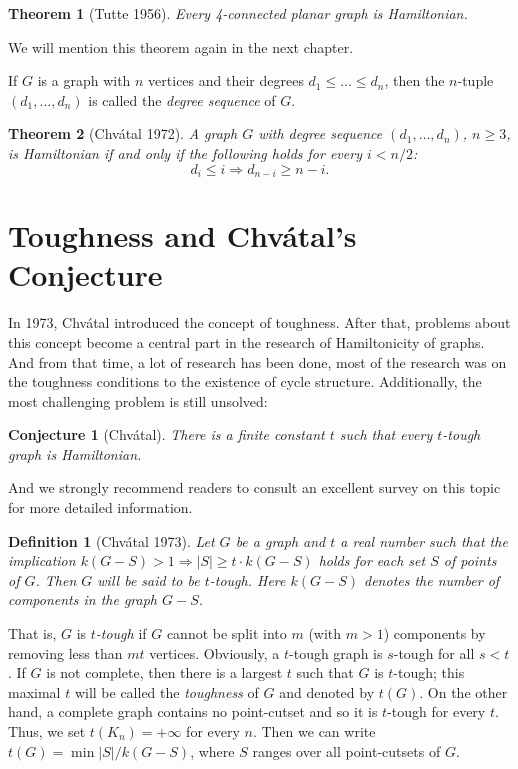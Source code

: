 \documentclass[12pt]{report}
\newtheorem{theorem}{Theorem}
\newtheorem{definition}{Definition}
\newtheorem{conjecture}{Conjecture}
\begin{document}
\begin{theorem}[Tutte 1956]\label{thm4cpgih1}
Every 4-connected planar graph is Hamiltonian.
\end{theorem}
We will mention this theorem again in the next chapter.

If $G$ is a graph with $n$ vertices and their degrees $d_1\le\ldots\le d_n$, then the $n$-tuple $(d_1,\ldots,d_n)$ is called the {\em degree sequence} of $G$.
\begin{theorem}[Chv{\'a}tal 1972]
A graph $G$ with degree sequence $(d_1,\ldots,d_n)$, $n\ge3$, is Hamiltonian if and only if the following holds for every $i<n/2$:
$$d_i\le i\Rightarrow d_{n-i}\ge n-i.$$
\end{theorem}





\section{Toughness and Chv{\'a}tal's Conjecture}
In 1973, Chv{\'a}tal \cite{chvatal1973tough} introduced the concept of toughness. After that, problems about this concept become a central part in the research of Hamiltonicity of graphs. And from that time, a lot of research has been done, most of the research was on the toughness conditions to the existence of cycle structure. Additionally, the most challenging problem is still unsolved: 
\begin{conjecture}[Chv{\'a}tal]\label{cj1chath}
There is a finite constant $t$ such that every $t$-tough graph is Hamiltonian.
\end{conjecture}
And we strongly recommend readers to consult an excellent survey \cite{MR2221006} on this topic for more detailed information.

\begin{definition}[Chv{\'a}tal 1973]\label{c1}
Let $G$ be a graph and $t$ a real number such that the implication $k(G-S)>1\Rightarrow |S|\ge t\cdot k(G-S)$ holds for each set $S$ of points of $G$. Then $G$ will be said to be $t$-tough. Here $k(G-S)$ denotes the number of components in the graph $G-S$.
\end{definition}
That is, $G$ is {\em $t$-tough} if $G$ cannot be split into $m$ (with $m>1$) components by removing less than $mt$ vertices.
Obviously, a $t$-tough graph is $s$-tough for all $s<t$. If $G$ is not complete, then there is a largest $t$ such that $G$ is $t$-tough; this maximal $t$ will be called the {\em toughness} of $G$ and denoted by $t(G)$. On the other hand, a complete graph contains no point-cutset and so it is $t$-tough for every $t$. Thus, we set $t(K_n)=+\infty$ for every $n$. Then we can write $t(G)=\min|S|/k(G-S)$, where $S$ ranges over all point-cutsets of $G$.
\end{document}
